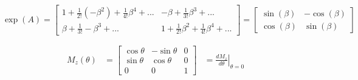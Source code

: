 \documentclass{article}
\begin{document}
$
    \exp(A) = 
        \begin{bmatrix}
        1 + \frac{1}{2!}(-\beta^{2}) + \frac{1}{4!}\beta^{4} + ... & -\beta + \frac{1}{3!}\beta^{3} + ...\\
        \beta + \frac{1}{3!}-\beta^{3} + ... & 1 + \frac{1}{2!}\beta^{2} + \frac{1}{4!}\beta^{4} + ...
        \end{bmatrix}
        = 
        \begin{bmatrix}
        \sin(\beta) & -\cos(\beta)\\
        \cos(\beta) & \sin(\beta)
        \end{bmatrix}
$

            \begin{equation}
            \begin{aligned}
                M_{z}(\theta) & =\begin{bmatrix}
                        \cos\theta & -\sin\theta & 0\\
                        \sin\theta & \cos\theta & 0\\   
                        0      &   0    & 1  
                    \end{bmatrix}  & = \left. \frac{d M_z}{d \theta} \right\rvert_{\theta=0} 
            \end{aligned}
            \end{equation}
\end{document}
